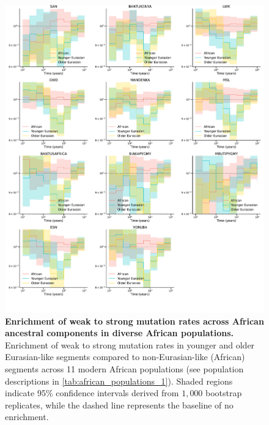 \begin{figure}
    \centering
    \includegraphics[width=\textwidth]{figures/gb_bta/gb_real_bta_11.pdf}
    \caption{\textbf{Enrichment of weak to strong mutation rates across African ancestral components in diverse African populations.} Enrichment of weak to strong mutation rates in younger and older Eurasian-like segments compared to non-Eurasian-like (African) segments across 11 modern African populations (see population descriptions in \ref{tab:african_populations_1}). Shaded regions indicate 95\% confidence intervals derived from $1{,}000$ bootstrap replicates, while the dashed line represents the baseline of no enrichment.
    }
    \label{fig:gb-mut-ws-pops}
\end{figure}

